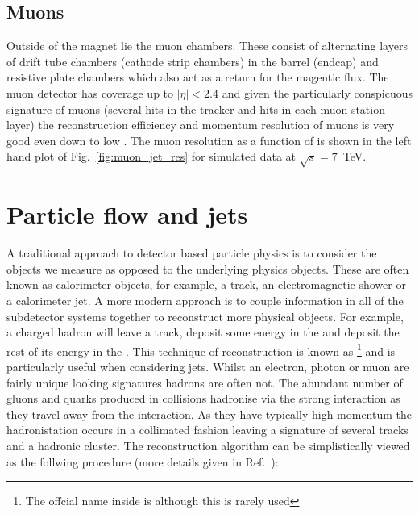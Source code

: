\subsection{Muons}
\label{sec:muons}
Outside of the magnet lie the \CMS muon chambers. These consist of alternating layers of drift tube chambers (cathode strip chambers) in the barrel (endcap) and resistive plate chambers which also act as a return for the magentic flux. The muon detector has coverage up to $|\eta|<2.4$ and given the particularly conspicuous signature of muons (several hits in the tracker and hits in each muon station layer) the reconstruction efficiency and momentum resolution of muons is very good even down to low \pT. The muon resolution as a function of \pT is shown in the left hand plot of Fig.~\ref{fig:muon_jet_res} for simulated data at $\sqrt{s}=7$~TeV.

\section{Particle flow and jets}
\label{sec:pflow_jets}
A traditional approach to detector based particle physics is to consider the objects we measure as opposed to the underlying physics objects. These are often known as calorimeter objects, for example, a track, an electromagnetic shower or a calorimeter jet. A more modern approach is to couple information in all of the subdetector systems together to reconstruct more physical objects. For example, a charged hadron will leave a track, deposit some energy in the \ECAL and deposit the rest of its energy in the \HCAL. This technique of reconstruction is known as \PF\footnote{The offcial name inside \CMS is \GED although this is rarely used} and is particularly useful when considering jets. Whilst an electron, photon or muon are fairly unique looking signatures hadrons are often not. The abundant number of gluons and quarks produced in \LHC collisions hadronise via the strong interaction as they travel away from the interaction. As they have typically high momentum the hadronistation occurs in a collimated fashion leaving a signature of several tracks and a hadronic cluster. The \PF reconstruction algorithm can be simplistically viewed as the follwing procedure (more details given in Ref.~\cite{cms_pf_algo}):

